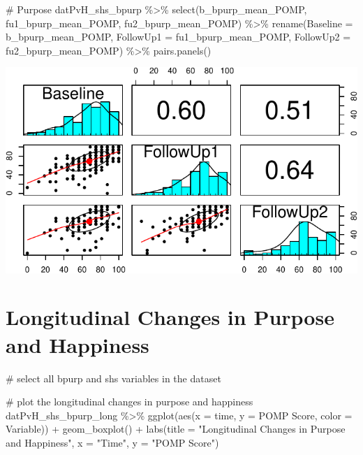 \documentclass[
  letterpaper,
  DIV=11,
  numbers=noendperiod]{scrartcl}
\newenvironment{Shaded}{\begin{snugshade}}{\end{snugshade}}
\newcommand{\AttributeTok}[1]{\textcolor[rgb]{0.40,0.45,0.13}{#1}}
\newcommand{\CommentTok}[1]{\textcolor[rgb]{0.37,0.37,0.37}{#1}}
\newcommand{\FunctionTok}[1]{\textcolor[rgb]{0.28,0.35,0.67}{#1}}
\newcommand{\NormalTok}[1]{\textcolor[rgb]{0.00,0.23,0.31}{#1}}
\newcommand{\SpecialCharTok}[1]{\textcolor[rgb]{0.37,0.37,0.37}{#1}}
\newcommand{\StringTok}[1]{\textcolor[rgb]{0.13,0.47,0.30}{#1}}
\begin{document}
\begin{Shaded}
\begin{Highlighting}[]
\CommentTok{\# Purpose}
\NormalTok{datPvH\_shs\_bpurp }\SpecialCharTok{\%\textgreater{}\%}
  \FunctionTok{select}\NormalTok{(b\_bpurp\_mean\_POMP, fu1\_bpurp\_mean\_POMP, fu2\_bpurp\_mean\_POMP) }\SpecialCharTok{\%\textgreater{}\%}
  \FunctionTok{rename}\NormalTok{(}\AttributeTok{Baseline =}\NormalTok{ b\_bpurp\_mean\_POMP,}
         \AttributeTok{FollowUp1 =}\NormalTok{ fu1\_bpurp\_mean\_POMP,}
         \AttributeTok{FollowUp2 =}\NormalTok{ fu2\_bpurp\_mean\_POMP) }\SpecialCharTok{\%\textgreater{}\%}
  \FunctionTok{pairs.panels}\NormalTok{()}
\end{Highlighting}
\end{Shaded}

\includegraphics{purpose_vs_happiness_supplement_files/figure-pdf/purpose-2.pdf}

\section{Longitudinal Changes in Purpose and
Happiness}\label{longitudinal-changes-in-purpose-and-happiness}

\begin{Shaded}
\begin{Highlighting}[]
\CommentTok{\# select all bpurp and shs variables in the dataset}

\CommentTok{\# plot the longitudinal changes in purpose and happiness}
\NormalTok{datPvH\_shs\_bpurp\_long }\SpecialCharTok{\%\textgreater{}\%} 
  \FunctionTok{ggplot}\NormalTok{(}\FunctionTok{aes}\NormalTok{(}\AttributeTok{x =}\NormalTok{ time, }\AttributeTok{y =} \StringTok{\textasciigrave{}}\AttributeTok{POMP Score}\StringTok{\textasciigrave{}}\NormalTok{, }\AttributeTok{color =}\NormalTok{ Variable)) }\SpecialCharTok{+}
  \FunctionTok{geom\_boxplot}\NormalTok{() }\SpecialCharTok{+}
  \FunctionTok{labs}\NormalTok{(}\AttributeTok{title =} \StringTok{"Longitudinal Changes in Purpose and Happiness"}\NormalTok{,}
       \AttributeTok{x =} \StringTok{"Time"}\NormalTok{,}
       \AttributeTok{y =} \StringTok{"POMP Score"}\NormalTok{)}
\end{Highlighting}
\end{Shaded}
\end{document}
